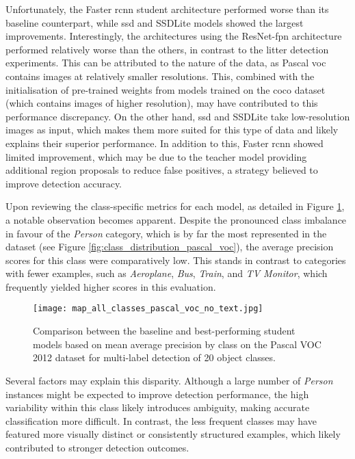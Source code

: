 Unfortunately, the Faster \gls{rcnn} student architecture performed worse than its baseline counterpart, while \gls{ssd} and SSDLite models showed the largest improvements. Interestingly, the architectures using the ResNet-\gls{fpn} architecture performed relatively worse than the others, in contrast to the litter detection experiments. This can be attributed to the nature of the data, as Pascal \gls{voc} contains images at relatively smaller resolutions. This, combined with the initialisation of pre-trained weights from models trained on the \gls{coco} dataset (which contains images of higher resolution), may have contributed to this performance discrepancy. On the other hand, \gls{ssd} and SSDLite take low-resolution images as input, which makes them more suited for this type of data and likely explains their superior performance. In addition to this, Faster \gls{rcnn} showed limited improvement, which may be due to the teacher model providing additional region proposals to reduce false positives, a strategy believed to improve detection accuracy.

Upon reviewing the class-specific metrics for each model, as detailed in Figure \ref{fig:pascal_voc_per_class}, a notable observation becomes apparent.
 Despite the pronounced class imbalance in favour of the \textit{Person} category, which is by far the most represented in the dataset (see Figure \ref{fig:class_distribution_pascal_voc}), the average precision scores for this class were comparatively low. This stands in contrast to categories with fewer examples, such as \textit{Aeroplane}, \textit{Bus}, \textit{Train}, and \textit{TV Monitor}, which frequently yielded higher scores in this evaluation.

\begin{figure}[!htbp]
    \centering
    \texttt{[image: map\_all\_classes\_pascal\_voc\_no\_text.jpg]}
    \caption{Comparison between the baseline and best-performing student models based on mean average precision by class on the Pascal VOC 2012 dataset for multi-label detection of 20 object classes.}
    \label{fig:pascal_voc_per_class}
\end{figure}

Several factors may explain this disparity. Although a large number of \textit{Person} instances might be expected to improve detection performance, the high variability within this class likely introduces ambiguity, making accurate classification more difficult. In contrast, the less frequent classes may have featured more visually distinct or consistently structured examples, which likely contributed to stronger detection outcomes.

